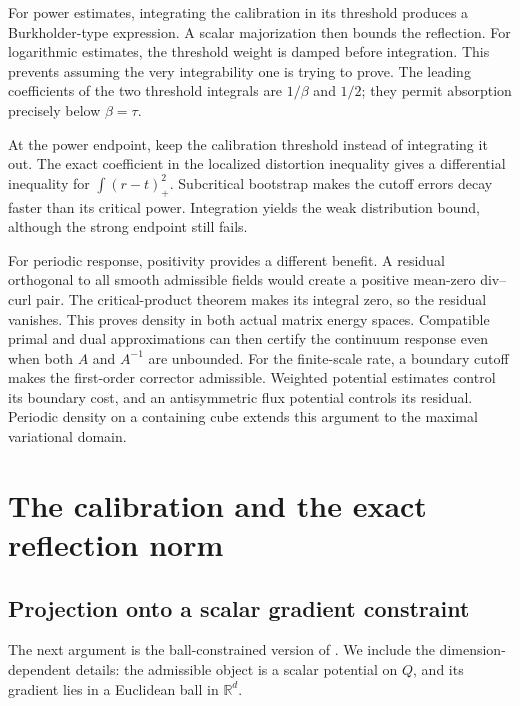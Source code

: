 \documentclass[11pt,a4paper]{article}
\numberwithin{equation}{section}
\theoremstyle{definition}
\theoremstyle{remark}\newtheorem{remark}[theorem]{Remark}
\newcommand{\R}{\mathbb R}
\begin{document}
For power estimates, integrating the calibration in its threshold produces
a Burkholder-type expression. A scalar majorization then bounds the
reflection. For logarithmic estimates, the threshold weight is damped
before integration. This prevents assuming the very integrability one is
trying to prove. The leading coefficients of the two threshold integrals
are \(1/\beta\) and \(1/2\); they permit absorption precisely below
\(\beta=\tau\).

At the power endpoint, keep the calibration threshold instead of
integrating it out. The exact coefficient in the localized distortion
inequality gives a differential inequality for
\(\int(r-t)_+^2\). Subcritical bootstrap makes the cutoff errors
decay faster than its critical power. Integration yields the weak
distribution bound, although the strong endpoint still fails.

For periodic response, positivity provides a different benefit. A residual
orthogonal to all smooth admissible fields would create a positive
mean-zero div--curl pair. The critical-product theorem makes its integral
zero, so the residual vanishes. This proves density in both actual matrix
energy spaces. Compatible primal and dual approximations can then certify
the continuum response even when both \(A\) and \(A^{-1}\) are unbounded.
For the finite-scale rate, a boundary cutoff makes the first-order
corrector admissible. Weighted potential estimates control its boundary
cost, and an antisymmetric flux potential controls its residual.
Periodic density on a containing cube extends this argument to
the maximal variational domain.
\FloatBarrier




\section{The calibration and the exact reflection norm}\label{sec:calibration}

\subsection{Projection onto a scalar gradient constraint}

The next argument is the ball-constrained version of
\cite[Lemma~4]{Agazzi2026}. We include the dimension-dependent details:
the admissible object is a scalar potential on \(Q\), and its gradient lies
in a Euclidean ball in \(\R^d\).
\end{document}
